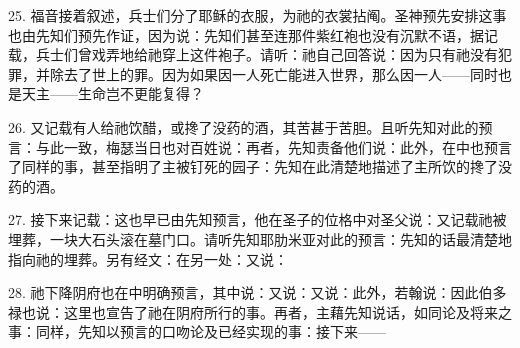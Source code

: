 25. 福音接着叙述，兵士们分了耶稣的衣服，为祂的衣裳拈阄。圣神预先安排这事也由先知们预先作证，因为说：先知们甚至连那件紫红袍也没有沉默不语，据记载，兵士们曾戏弄地给祂穿上这件袍子。请听：祂自己回答说：因为只有祂没有犯罪，并除去了世上的罪。因为如果因一人死亡能进入世界，那么因一人——同时也是天主——生命岂不更能复得？\par

26. 又记载有人给祂饮醋，或搀了没药的酒，其苦甚于苦胆。且听先知对此的预言：与此一致，梅瑟当日也对百姓说：再者，先知责备他们说：此外，在中也预言了同样的事，甚至指明了主被钉死的园子：先知在此清楚地描述了主所饮的搀了没药的酒。\par

27. 接下来记载：这也早已由先知预言，他在圣子的位格中对圣父说：又记载祂被埋葬，一块大石头滚在墓门口。请听先知耶肋米亚对此的预言：先知的话最清楚地指向祂的埋葬。另有经文：在另一处：又说：\par

28. 祂下降阴府也在中明确预言，其中说：又说：又说：此外，若翰说：因此伯多禄也说：这里也宣告了祂在阴府所行的事。再者，主藉先知说话，如同论及将来之事：同样，先知以预言的口吻论及已经实现的事：接下来——\par

